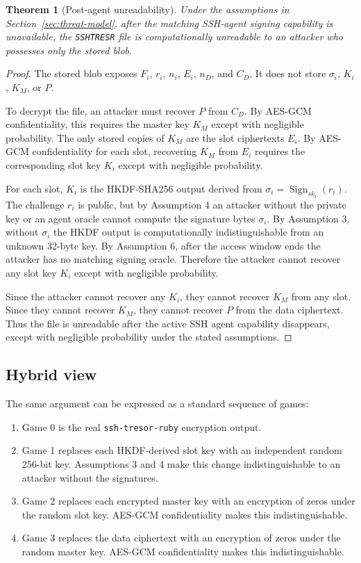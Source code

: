 \documentclass[11pt]{article}
\theoremstyle{definition}
\theoremstyle{plain}
\newtheorem{theorem}{Theorem}
\newcommand{\Project}{\texttt{ssh-tresor-ruby}}
\newcommand{\Tresor}{\texttt{SSHTRESR}}
\newcommand{\Sign}{\operatorname{Sign}}
\begin{document}
\begin{theorem}[Post-agent unreadability]
Under the assumptions in Section~\ref{sec:threat-model}, after the matching SSH-agent signing capability is unavailable, the \Tresor{} file is computationally unreadable to an attacker who possesses only the stored blob.
\end{theorem}

\begin{proof}
The stored blob exposes $F_i$, $r_i$, $n_i$, $E_i$, $n_D$, and $C_D$. It does not store $\sigma_i$, $K_i$, $K_M$, or $P$.

To decrypt the file, an attacker must recover $P$ from $C_D$. By AES-GCM confidentiality, this requires the master key $K_M$ except with negligible probability. The only stored copies of $K_M$ are the slot ciphertexts $E_i$. By AES-GCM confidentiality for each slot, recovering $K_M$ from $E_i$ requires the corresponding slot key $K_i$ except with negligible probability.

For each slot, $K_i$ is the HKDF-SHA256 output derived from $\sigma_i=\Sign_{sk_i}(r_i)$. The challenge $r_i$ is public, but by Assumption 4 an attacker without the private key or an agent oracle cannot compute the signature bytes $\sigma_i$. By Assumption 3, without $\sigma_i$ the HKDF output is computationally indistinguishable from an unknown 32-byte key. By Assumption 6, after the access window ends the attacker has no matching signing oracle. Therefore the attacker cannot recover any slot key $K_i$ except with negligible probability.

Since the attacker cannot recover any $K_i$, they cannot recover $K_M$ from any slot. Since they cannot recover $K_M$, they cannot recover $P$ from the data ciphertext. Thus the file is unreadable after the active SSH agent capability disappears, except with negligible probability under the stated assumptions.
\end{proof}

\subsection{Hybrid view}

The same argument can be expressed as a standard sequence of games:

\begin{enumerate}[leftmargin=*]
  \item Game 0 is the real \Project{} encryption output.
  \item Game 1 replaces each HKDF-derived slot key with an independent random 256-bit key. Assumptions 3 and 4 make this change indistinguishable to an attacker without the signatures.
  \item Game 2 replaces each encrypted master key with an encryption of zeros under the random slot key. AES-GCM confidentiality makes this indistinguishable.
  \item Game 3 replaces the data ciphertext with an encryption of zeros under the random master key. AES-GCM confidentiality makes this indistinguishable.
\end{enumerate}
\end{document}
